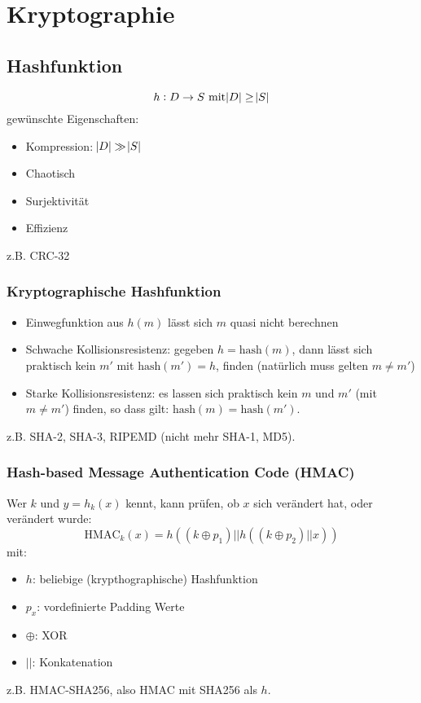 \chapter{Kryptographie}
\section{Hashfunktion}
\begin{equation*}
    h: D \to S \text{ mit} \abs{D} \geq \abs{S}
\end{equation*}
gewünschte Eigenschaften:
\begin{itemize}
    \item Kompression: $\abs{D} \gg \abs{S}$
    \item Chaotisch
    \item Surjektivität
    \item Effizienz
\end{itemize}
z.B. CRC-32

\subsection{Kryptographische Hashfunktion}
\begin{itemize}
    \item Einwegfunktion aus $h(m)$ lässt sich $m$ quasi nicht berechnen
    \item Schwache Kollisionsresistenz: gegeben $h = \text{hash}(m)$, 
        dann lässt sich praktisch kein $m'$ mit $\text{hash}(m') = h$,
        finden (natürlich muss gelten $m \neq m'$)
    \item Starke Kollisionsresistenz: es lassen sich praktisch kein
        $m$ und $m'$ (mit $m \neq m'$) finden, so dass gilt:
        $\text{hash}(m) = \text{hash}(m')$.
\end{itemize}
z.B. SHA-2, SHA-3, RIPEMD (nicht mehr SHA-1, MD5).

\subsection{Hash-based Message Authentication Code (HMAC)}
Wer $k$ und $y = h_k(x)$ kennt, kann prüfen, ob $x$ sich verändert hat, oder verändert wurde:
\begin{equation*}
    {\text{HMAC}}_k(x) = h\left( (k \oplus p_1) || h\left((k \oplus p_2) || x\right)\right)
\end{equation*}
mit:
\begin{itemize}
    \item $h$: beliebige (krypthographische) Hashfunktion
    \item $p_x$: vordefinierte Padding Werte
    \item $\oplus$: XOR
    \item $||$: Konkatenation
\end{itemize}
z.B. HMAC-SHA256, also HMAC mit SHA256 als $h$.

